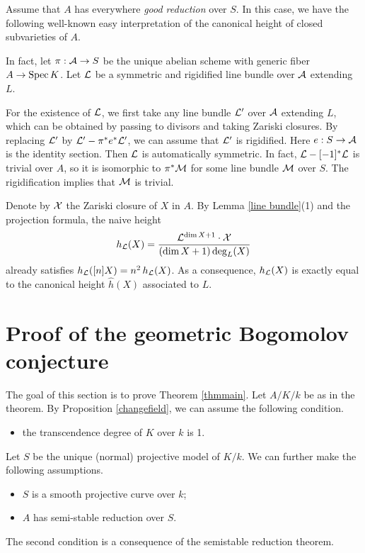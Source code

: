 \documentclass[12pt]{amsart}
\begin{document}
Assume that $A$ has everywhere \emph{good reduction} over $S$.
In this case, we have the following well-known easy interpretation of the canonical height of closed subvarieties of $A$. 

In fact, let $\pi:{\mathcal A}\to S$ be the unique abelian scheme with generic fiber $A\to {\rm Spec \,} K$.
Let ${\mathcal L}$ be a symmetric and rigidified line bundle over ${\mathcal A}$ extending $L$.

For the existence of ${\mathcal L}$, we first take any line bundle ${\mathcal L}'$ over ${\mathcal A}$ extending $L$, which can be obtained by passing to divisors and taking Zariski closures. 
By replacing ${\mathcal L}'$ by ${\mathcal L}'-\pi^*e^*{\mathcal L}'$, we can assume that ${\mathcal L}'$ is rigidified.  Here $e:S\to{\mathcal A}$ is the identity section.
Then ${\mathcal L}$ is automatically symmetric. 
In fact, ${\mathcal L}-[-1]^*{\mathcal L}$ is trivial over $A$, so it is isomorphic to $\pi^*{\mathcal M}$ for some line bundle ${\mathcal M}$ over $S$.
The rigidification implies that ${\mathcal M}$ is trivial. 

Denote by ${\mathcal X}$ the Zariski closure of $X$ in $A$. 
By Lemma \ref{line bundle}(1) and the projection formula, the naive height
$$
h_{{\mathcal L}}(X)=\frac{{\mathcal L}^{\dim X+1}\cdot {\mathcal X}}{(\dim X+1)\deg_L(X)}
$$
already satisfies
$h_{{\mathcal L}}([n]X)=n^2\, h_{{\mathcal L}}(X)$. 
As a consequence, $h_{{\mathcal L}}(X)$ is exactly equal to the canonical height 
$\hat h(X)$ associated to $L$.



\section{Proof of the geometric Bogomolov conjecture} \label{sec final}

The goal of this section is to prove Theorem \ref{thmmain}.
Let $A/K/k$ be as in the theorem. 
By Proposition \ref{changefield}, we can assume the following condition.
\begin{itemize}
\item[(a)] the transcendence degree of $K$ over $k$ is 1. 
\end{itemize}
Let $S$ be the unique (normal) projective model of $K/k$. 
We can further make the following assumptions.
\begin{itemize}
\item[(b)] $S$ is a smooth projective curve over $k$;
\item[(c)] $A$ has semi-stable reduction over $S$. 
\end{itemize}
The second condition is a consequence of the semistable reduction theorem. 
\end{document}
